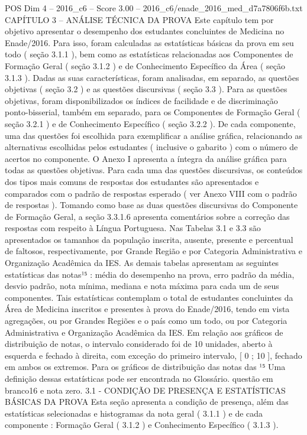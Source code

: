 \begin{textsample}{POS Dim 4 – 2016\_c6 – Score 3.00 – 2016\_c6/enade\_2016\_med\_d7a7806f6b.txt}  \label{ex:f4_pos_059}
CAPÍTULO 3 – ANÁLISE TÉCNICA DA PROVA Este capítulo tem por objetivo apresentar o desempenho dos estudantes concluintes de Medicina no Enade/2016.
Para isso, foram calculadas as estatísticas básicas da prova em seu todo ( seção 3.1.1 ), bem como as estatísticas relacionadas aos Componentes de Formação Geral ( seção 3.1.2 ) e de Conhecimento Específico da Área ( seção 3.1.3 ).
Dadas as suas características, foram analisadas, em separado, as questões objetivas ( seção 3.2 ) e as questões discursivas ( seção 3.3 ).
Para as questões objetivas, foram disponibilizados os índices de facilidade e de discriminação ponto-bisserial, também em separado, para os Componentes de Formação Geral ( seção 3.2.1 ) e de Conhecimento Específico ( seção 3.2.2 ).
De cada componente, uma das questões foi escolhida para exemplificar a análise gráfica, relacionando as alternativas escolhidas pelos estudantes ( inclusive o gabarito ) com o número de acertos no componente.
O Anexo I apresenta a íntegra da análise gráfica para todas as questões objetivas.
Para cada uma das questões discursivas, os conteúdos dos tipos mais comuns de respostas dos estudantes são apresentados e comparados com o padrão de respostas esperado ( ver Anexo VIII com o padrão de respostas ).
Tomando como base as duas questões discursivas do Componente de Formação Geral, a seção 3.3.1.6 apresenta comentários sobre a correção das respostas com respeito à Língua Portuguesa.
Nas Tabelas 3.1 e 3.3 são apresentados os tamanhos da população inscrita, ausente, presente e percentual de faltosos, respectivamente, por Grande Região e por Categoria Administrativa e Organização Acadêmica da IES.
As demais tabelas apresentam as seguintes estatísticas das notas¹⁵ : média do desempenho na prova, erro padrão da média, desvio padrão, nota mínima, mediana e nota máxima para cada um de seus componentes.
Tais estatísticas contemplam o total de estudantes concluintes da Área de Medicina inscritos e presentes à prova do Enade/2016, tendo em vista agregações, ou por Grandes Regiões e o país como um todo, ou por Categoria Administrativa e Organização Acadêmica da IES.
Em relação aos gráficos de distribuição de notas, o intervalo considerado foi de 10 unidades, aberto à esquerda e fechado à direita, com exceção do primeiro intervalo, [ 0 ; 10 ], fechado em ambos os extremos.
Para os gráficos de distribuição das notas das ¹⁵ Uma definição dessas estatísticas pode ser encontrada no Glossário. questão em branco16 e nota zero. 3.1 - CONDIÇÃO DE PRESENÇA E ESTATÍSTICAS BÁSICAS DA PROVA Esta seção apresenta a condição de presença, além das estatísticas selecionadas e histogramas da nota geral ( 3.1.1 ) e de cada componente : Formação Geral ( 3.1.2 ) e Conhecimento Específico ( 3.1.3 ).

\end{textsample}
